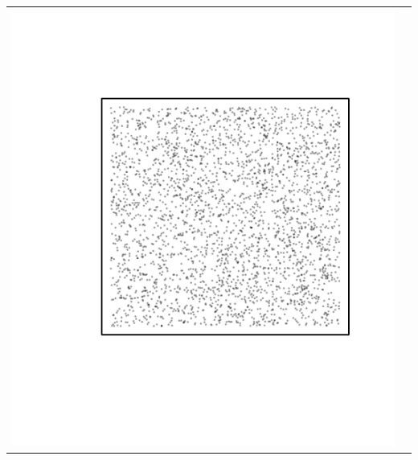 \documentclass{article}\usepackage{graphicx, color}
\makeatletter
\def\maxwidth{ %
  \ifdim\Gin@nat@width>\linewidth
    \linewidth
  \else
    \Gin@nat@width
  \fi
}
\newenvironment{knitrout}{}{} %
\makeatother
\begin{document}
\vspace*{-1.75in}
\begin{tabular}{cc}
\begin{knitrout}
\definecolor{shadecolor}{rgb}{0.969, 0.969, 0.969}\color{fgcolor}\includegraphics[width=\maxwidth]{figure/unnamed-chunk-11} 
\end{knitrout}


\end{tabular}
\end{document}
